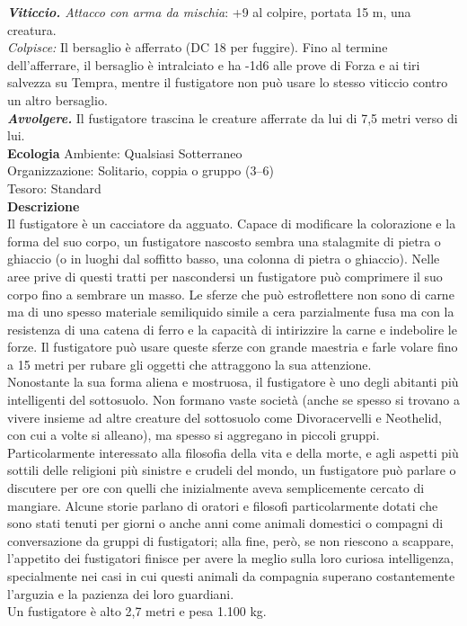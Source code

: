 \begin{multicols}{2}
\emph{\textbf{Viticcio.} Attacco con arma da mischia}: +9 al colpire, portata 15 m, una creatura.\\
\emph{Colpisce:} Il bersaglio è afferrato (DC  18 per fuggire). Fino al termine dell'afferrare, il bersaglio è intralciato e ha -1d6 alle prove di Forza e ai tiri salvezza su Tempra, mentre il fustigatore non può usare lo stesso viticcio contro un altro bersaglio.\\
\emph{\textbf{Avvolgere.}} Il fustigatore trascina le creature afferrate da lui di 7,5 metri verso di lui.\\
\textbf{Ecologia}
Ambiente: Qualsiasi Sotterraneo\\
Organizzazione: Solitario, coppia o gruppo (3–6)\\
Tesoro: Standard\\
\textbf{Descrizione}\\
Il fustigatore è un cacciatore da agguato. Capace di modificare la colorazione e la forma del suo corpo, un fustigatore nascosto sembra una stalagmite di pietra o ghiaccio (o in luoghi dal soffitto basso, una colonna di pietra o ghiaccio). Nelle aree prive di questi tratti per nascondersi un fustigatore può comprimere il suo corpo fino a sembrare un masso. Le sferze che può estroflettere non sono di carne ma di uno spesso materiale semiliquido simile a cera parzialmente fusa ma con la resistenza di una catena di ferro e la capacità di intirizzire la carne e indebolire le forze. Il fustigatore può usare queste sferze con grande maestria e farle volare fino a 15 metri per rubare gli oggetti che attraggono la sua attenzione.\\

Nonostante la sua forma aliena e mostruosa, il fustigatore è uno degli abitanti più intelligenti del sottosuolo. Non formano vaste società (anche se spesso si trovano a vivere insieme ad altre creature del sottosuolo come Divoracervelli e Neothelid, con cui a volte si alleano), ma spesso si aggregano in piccoli gruppi. Particolarmente interessato alla filosofia della vita e della morte, e agli aspetti più sottili delle religioni più sinistre e crudeli del mondo, un fustigatore può parlare o discutere per ore con quelli che inizialmente aveva semplicemente cercato di mangiare. Alcune storie parlano di oratori e filosofi particolarmente dotati che sono stati tenuti per giorni o anche anni come animali domestici o compagni di conversazione da gruppi di fustigatori; alla fine, però, se non riescono a scappare, l'appetito dei fustigatori finisce per avere la meglio sulla loro curiosa intelligenza, specialmente nei casi in cui questi animali da compagnia superano costantemente l'arguzia e la pazienza dei loro guardiani.\\
Un fustigatore è alto 2,7 metri e pesa 1.100 kg.\\


\end{multicols}
